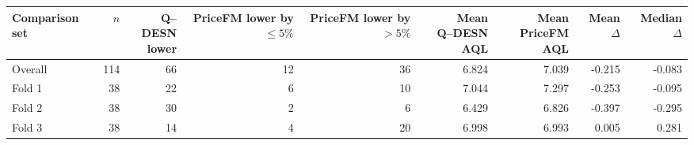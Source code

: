 \begingroup
\TableStyle
\scriptsize
\setlength{\tabcolsep}{3pt}
\begin{tabular}{@{}lrrrrrrrr@{}}
\toprule
Comparison set & $n$ & \shortstack{Q--DESN\\lower} & \shortstack{PriceFM\\lower by $\leq 5\%$} & \shortstack{PriceFM\\lower by $>5\%$} & \shortstack{Mean\\Q--DESN AQL} & \shortstack{Mean\\PriceFM AQL} & \shortstack{Mean\\$\Delta$} & \shortstack{Median\\$\Delta$} \\
\midrule
Overall & 114 & 66 & 12 & 36 & 6.824 & 7.039 & -0.215 & -0.083 \\
Fold 1 & 38 & 22 & 6 & 10 & 7.044 & 7.297 & -0.253 & -0.095 \\
Fold 2 & 38 & 30 & 2 & 6 & 6.429 & 6.826 & -0.397 & -0.295 \\
Fold 3 & 38 & 14 & 4 & 20 & 6.998 & 6.993 & 0.005 & 0.281 \\
\bottomrule
\end{tabular}
\endgroup
